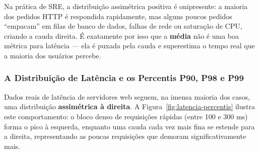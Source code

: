 \documentclass[12pt,a4paper,twoside]{report}
\begin{document}
Na prática de SRE, a distribuição assimétrica positiva é onipresente: a maioria dos pedidos HTTP é respondida rapidamente, mas alguns poucos pedidos ``empacam'' em filas de banco de dados, falhas de rede ou saturação de CPU, criando a cauda direita. É exatamente por isso que a \textbf{média} não é uma boa métrica para latência --- ela é puxada pela cauda e superestima o tempo real que a maioria dos usuários percebe.

\subsubsection{A Distribuição de Latência e os Percentis P90, P98 e P99}

Dados reais de latência de servidores web seguem, na imensa maioria dos casos, uma distribuição \textbf{assimétrica à direita}. A Figura~\ref{fig:latencia-percentis} ilustra este comportamento: o bloco denso de requisições rápidas (entre 100 e 300 ms) forma o pico à esquerda, enquanto uma cauda cada vez mais fina se estende para a direita, representando as poucas requisições que demoram significativamente mais.
\end{document}

